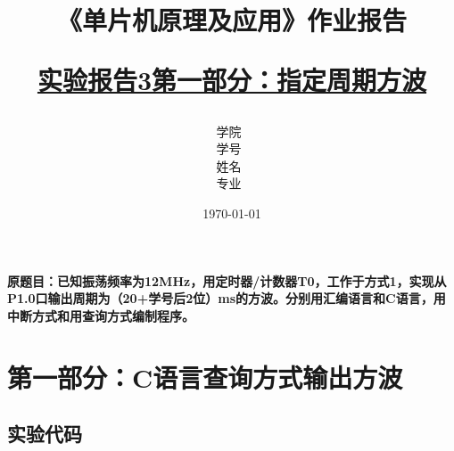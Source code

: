 \documentclass[12pt,hyperref,a4paper,UTF8]{ctexart}
\title{ 
        \vspace{1cm}
        \heiti \Huge \textbf{《单片机原理及应用》作业报告} \par
        \vspace{1cm} 
        \heiti \Large {\underline{实验报告3第一部分：指定周期方波}   } 
        \vspace{3cm}
    
    }
\author{
        \vspace{0.5cm}
        \kaishu\Large 学院\ \dlmu[9cm]{卓越学院} \\ %
        \vspace{0.5cm}
        \kaishu\Large 学号\ \dlmu[9cm]{23040447} \\ %
        \vspace{0.5cm}
        \kaishu\Large 姓名\ \dlmu[9cm]{陈文轩} \qquad  \\ %
        \vspace{0.5cm}
        \kaishu\Large 专业\ \dlmu[9cm]{智能硬件与系统(电子信息工程)} \qquad \\ %
    }
\date{\today} %
\begin{document}
\cover
\thispagestyle{empty} %







\newpage
\setcounter{page}{1} %



\textbf{原题目：已知振荡频率为12MHz，用定时器/计数器T0，工作于方式1，实现从P1.0口输出周期为（20+学号后2位）ms的方波。分别用汇编语言和C语言，用中断方式和用查询方式编制程序。}

\section{第一部分：C语言查询方式输出方波}
\subsection{实验代码}
\end{document}
